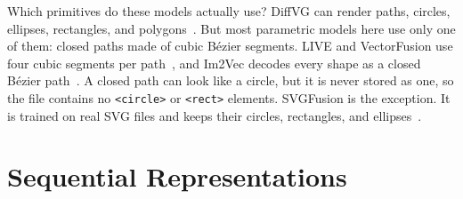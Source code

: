 Which primitives do these models actually use? DiffVG can render paths, circles, ellipses, rectangles, and 
polygons~\cite{liDifferentiableVectorGraphics2020a}. But most parametric models here use only one of them: closed paths 
made of cubic B\'{e}zier segments. LIVE and VectorFusion use four cubic segments per 
path~\cite{maLayerwiseImageVectorization2022, jainVectorFusionTexttoSVGAbstracting2022}, and Im2Vec decodes every shape 
as a closed B\'{e}zier path~\cite{reddyIm2VecSynthesizingVector2021}. A closed path can look like a circle, but it is never 
stored as one, so the file contains no \texttt{<circle>} or \texttt{<rect>} elements. SVGFusion is the exception. 
It is trained on real SVG files and keeps their circles, rectangles, and ellipses~\cite{xingSVGFusionScalableTexttoSVG2025}.



\section{Sequential Representations}
\label{sec:sequential}

